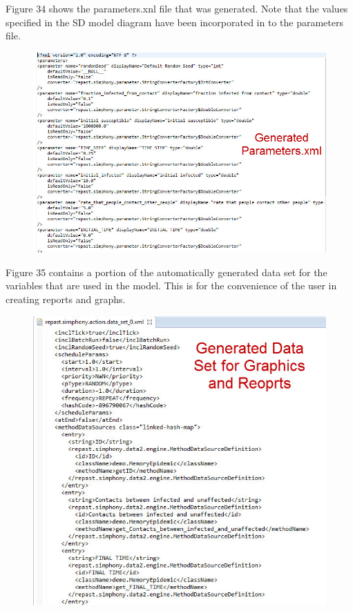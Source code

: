 \documentclass[11pt]{amsart}
\begin{document}
Figure 34 shows the parameters.xnl file that was generated. Note that the values specified in the SD model diagram have been incorporated in to the parameters file.


\begin{figure}[ht]
\begin{center}
\vspace{.2in}
\centerline {
\includegraphics[totalheight=0.4\textheight]{images/032.jpg}
}
\caption{}
\label{fig:032}
\end{center}
\end{figure}

Figure 35 contains a portion of the automatically generated data set for the variables that are used in the model. This is for the convenience of the user in creating reports and graphs. 

\clearpage

\begin{figure}[ht]
\begin{center}
\vspace{.2in}
\centerline {
\includegraphics[totalheight=0.5\textheight]{images/033.jpg}
}
\caption{}
\label{fig:033}
\end{center}
\end{figure}
\end{document}

